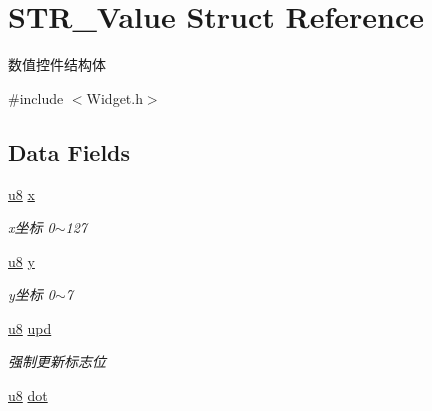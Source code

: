 \hypertarget{struct_s_t_r___value}{\section{\-S\-T\-R\-\_\-\-Value \-Struct \-Reference}
\label{struct_s_t_r___value}
}


数值控件结构体  




{\ttfamily \#include $<$\-Widget.\-h$>$}

\subsection*{\-Data \-Fields}
\begin{DoxyCompactItemize}
\item 
\hypertarget{struct_s_t_r___value_a66ab7498cbcfba822aa9a2891beffae2}{\hyperlink{group___b_s_p_gaed742c436da53c1080638ce6ef7d13de}{u8} \hyperlink{struct_s_t_r___value_a66ab7498cbcfba822aa9a2891beffae2}{x}}\label{struct_s_t_r___value_a66ab7498cbcfba822aa9a2891beffae2}

\begin{DoxyCompactList}\small\item\em x坐标 0$\sim$127 \end{DoxyCompactList}\item 
\hypertarget{struct_s_t_r___value_ad87f9078b74ef74a58041131d06283c2}{\hyperlink{group___b_s_p_gaed742c436da53c1080638ce6ef7d13de}{u8} \hyperlink{struct_s_t_r___value_ad87f9078b74ef74a58041131d06283c2}{y}}\label{struct_s_t_r___value_ad87f9078b74ef74a58041131d06283c2}

\begin{DoxyCompactList}\small\item\em y坐标 0$\sim$7 \end{DoxyCompactList}\item 
\hypertarget{struct_s_t_r___value_a70f704b92411670f99563a59c6f9a4b5}{\hyperlink{group___b_s_p_gaed742c436da53c1080638ce6ef7d13de}{u8} \hyperlink{struct_s_t_r___value_a70f704b92411670f99563a59c6f9a4b5}{upd}}\label{struct_s_t_r___value_a70f704b92411670f99563a59c6f9a4b5}

\begin{DoxyCompactList}\small\item\em 强制更新标志位 \end{DoxyCompactList}\item 
\hypertarget{struct_s_t_r___value_aee9f1907bcfc8abb76f2b87076326c6a}{\hyperlink{group___b_s_p_gaed742c436da53c1080638ce6ef7d13de}{u8} \hyperlink{struct_s_t_r___value_aee9f1907bcfc8abb76f2b87076326c6a}{dot}}\label{struct_s_t_r___value_aee9f1907bcfc8abb76f2b87076326c6a}


\end{DoxyCompactItemize}
